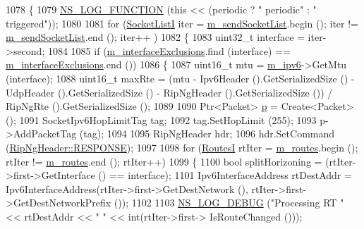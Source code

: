 \begin{DoxyCode}
1078 \{
1079   \hyperlink{log-macros-disabled_8h_a90b90d5bad1f39cb1b64923ea94c0761}{NS\_LOG\_FUNCTION} (\textcolor{keyword}{this} << (periodic ? \textcolor{stringliteral}{" periodic"} : \textcolor{stringliteral}{" triggered"}));
1080 
1081   \textcolor{keywordflow}{for} (\hyperlink{classns3_1_1RipNg_a549052bbb55168d029f82d78384144b4}{SocketListI} iter = \hyperlink{classns3_1_1RipNg_a761d304dc3d34cd528afe87c5fa8090b}{m\_sendSocketList}.begin (); iter != 
      \hyperlink{classns3_1_1RipNg_a761d304dc3d34cd528afe87c5fa8090b}{m\_sendSocketList}.end (); iter++ )
1082     \{
1083       uint32\_t \textcolor{keyword}{interface }= iter->second;
1084 
1085       \textcolor{keywordflow}{if} (\hyperlink{classns3_1_1RipNg_a98c5b63bb7c56afa595c1bb568a7081f}{m\_interfaceExclusions}.find (interface) == 
      \hyperlink{classns3_1_1RipNg_a98c5b63bb7c56afa595c1bb568a7081f}{m\_interfaceExclusions}.end ())
1086         \{
1087           uint16\_t mtu = \hyperlink{classns3_1_1RipNg_aca7a023799ce2004499a826ba5d5d3fe}{m\_ipv6}->GetMtu (interface);
1088           uint16\_t maxRte = (mtu - Ipv6Header ().GetSerializedSize () - UdpHeader ().GetSerializedSize () -
       RipNgHeader ().GetSerializedSize ()) / RipNgRte ().GetSerializedSize ();
1089 
1090           Ptr<Packet> \hyperlink{lte__link__budget_8m_ac9de518908a968428863f829398a4e62}{p} = Create<Packet> ();
1091           SocketIpv6HopLimitTag tag;
1092           tag.SetHopLimit (255);
1093           p->AddPacketTag (tag);
1094 
1095           RipNgHeader hdr;
1096           hdr.SetCommand (\hyperlink{classns3_1_1RipNgHeader_ad96724d6f6fdb4ffa22fe71a0ff12bd2a787536902c0e1912fd0c234def4c32b7}{RipNgHeader::RESPONSE});
1097 
1098           \textcolor{keywordflow}{for} (\hyperlink{classns3_1_1RipNg_aa8bc6103d67089e1e3cd507936f94887}{RoutesI} rtIter = \hyperlink{classns3_1_1RipNg_acfc1011b140f9e612a8c27c9bfb4c6b5}{m\_routes}.begin (); rtIter != 
      \hyperlink{classns3_1_1RipNg_acfc1011b140f9e612a8c27c9bfb4c6b5}{m\_routes}.end (); rtIter++)
1099             \{
1100               \textcolor{keywordtype}{bool} splitHorizoning = (rtIter->first->GetInterface () == interface);
1101               Ipv6InterfaceAddress rtDestAddr = Ipv6InterfaceAddress(rtIter->first->GetDestNetwork (), 
      rtIter->first->GetDestNetworkPrefix ());
1102 
1103               \hyperlink{group__logging_ga413f1886406d49f59a6a0a89b77b4d0a}{NS\_LOG\_DEBUG} (\textcolor{stringliteral}{"Processing RT "} << rtDestAddr << \textcolor{stringliteral}{" "} << \textcolor{keywordtype}{int}(rtIter->first->
      IsRouteChanged ()));

\end{DoxyCode}
